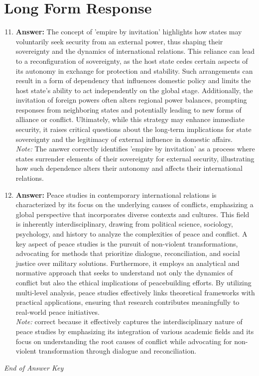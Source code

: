 \documentclass[12pt]{article}
\begin{document}
\section*{Long Form Response}
\begin{enumerate}[label=\arabic*.]
\setcounter{enumi}{10}
\item \textbf{Answer:} The concept of 'empire by invitation' highlights how states may voluntarily seek security from an external power, thus shaping their sovereignty and the dynamics of international relations. This reliance can lead to a reconfiguration of sovereignty, as the host state cedes certain aspects of its autonomy in exchange for protection and stability. Such arrangements can result in a form of dependency that influences domestic policy and limits the host state's ability to act independently on the global stage. Additionally, the invitation of foreign powers often alters regional power balances, prompting responses from neighboring states and potentially leading to new forms of alliance or conflict. Ultimately, while this strategy may enhance immediate security, it raises critical questions about the long-term implications for state sovereignty and the legitimacy of external influence in domestic affairs.
\\ \textit{Note:} The answer correctly identifies 'empire by invitation' as a process where states surrender elements of their sovereignty for external security, illustrating how such dependence alters their autonomy and affects their international relations.
\item \textbf{Answer:} Peace studies in contemporary international relations is characterized by its focus on the underlying causes of conflicts, emphasizing a global perspective that incorporates diverse contexts and cultures. This field is inherently interdisciplinary, drawing from political science, sociology, psychology, and history to analyze the complexities of peace and conflict. A key aspect of peace studies is the pursuit of non-violent transformations, advocating for methods that prioritize dialogue, reconciliation, and social justice over military solutions. Furthermore, it employs an analytical and normative approach that seeks to understand not only the dynamics of conflict but also the ethical implications of peacebuilding efforts. By utilizing multi-level analysis, peace studies effectively links theoretical frameworks with practical applications, ensuring that research contributes meaningfully to real-world peace initiatives.
\\ \textit{Note:} correct because it effectively captures the interdisciplinary nature of peace studies by emphasizing its integration of various academic fields and its focus on understanding the root causes of conflict while advocating for non-violent transformation through dialogue and reconciliation.
\end{enumerate}

\vfill
\noindent\textit{End of Answer Key}
\end{document}
